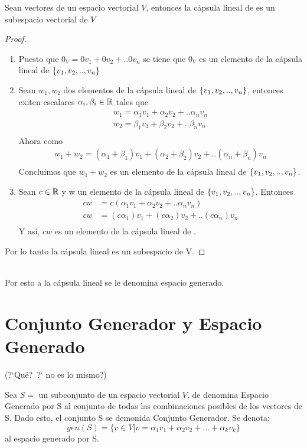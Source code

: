 \begin{theorem}
Sean  vectores de un espacio vectorial $V$, entonces la c\'apsula lineal de  es un subespacio vectorial de $V$
\end{theorem}
\begin{proof}~\\
\begin{enumerate}
\item Puesto que $0_V=0 v_1+0 v_2+..0 v_n$ se tiene que $0_V$ es un elemento de la cápsula lineal de $ \left\{v_1, v_2, .., v_n \right\} $
\item Sean $w_1, w_2$ dos elementos de la cápsula lineal de $ \left\{v_1, v_2, .., v_n \right\} $, entonces exiten escalares $\alpha_i, \beta_i \in \mathbb{R}$ tales que \begin{align*}
w_1=\alpha_1 v_1+\alpha_2 v_2+..\alpha_n v_n\\
w_2=\beta_1 v_1+\beta_2 v_2+..\beta_n v_n\\
\end{align*}
Ahora como
\begin{align*}
w_1+w_2=(\alpha_1+\beta_1) v_1+(\alpha_2+\beta_2) v_2+..(\alpha_n+\beta_n) v_n\\
\end{align*}
Concluimos que $w_1+w_2$ es un elemento de la cápsula lineal de $ \left\{v_1, v_2, .., v_n \right\} $.
\item Sean $c \in \mathbb{R}$ y w un elemento de la cápsula lineal de $ \left\{v_1, v_2, .., v_n \right\} $. Entonces 
\begin{align*}
cw&=c(\alpha_1 v_1+\alpha_2 v_2+..\alpha_n v_n)\\
cw&=(c\alpha_1) v_1+(c\alpha_2) v_2+..(c\alpha_n) v_n\\
\end{align*}
Y así, $cw $ es un elemento de la cápsula lineal de .
\end{enumerate}
Por lo tanto la cápsula lineal es un subespacio de V.
\end{proof}


~\\
Por esto a la c\'apsula lineal se le denomina espacio generado.

\section{Conjunto Generador y Espacio Generado}(?`Qu\'e?\ ?` no es lo mismo?)


\begin{dfn}
Sea $S=$ un subconjunto de un espacio vectorial $V$, de denomina Espacio Generado por S al conjunto de todas las combinaciones posibles de los vectores de S. Dado esto, el conjunto S se demonida Conjunto Generador. Se denota:
\[gen(S)=
\lbrace v \in V|v=\alpha_1 v_1+
\alpha_2 v_2+
\ldots+
\alpha_k v_k
\rbrace
\]
al espacio generado por S.
\end{dfn}


